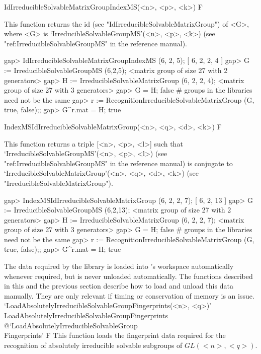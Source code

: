 \>IdIrreducibleSolvableMatrixGroupIndexMS(<n>, <p>, <k>) F

This function returns the id (see "IdIrreducibleSolvableMatrixGroup") of <G>, 
where <G> is `IrreducibleSolvableGroupMS'(<n>, <p>, <k>) (see "ref:IrreducibleSolvableGroupMS" in the {\GAP} reference manual).

\beginexample
gap> IdIrreducibleSolvableMatrixGroupIndexMS (6, 2, 5);
[ 6, 2, 2, 4 ]
gap> G := IrreducibleSolvableGroupMS (6,2,5);
<matrix group of size 27 with 2 generators>
gap> H := IrreducibleSolvableMatrixGroup (6, 2, 2, 4);
<matrix group of size 27 with 3 generators>
gap> G = H;
false # groups in the libraries need not be the same
gap> r := RecognitionIrreducibleSolvableMatrixGroup (G, true, false);;
gap> G^r.mat = H;
true
\endexample

\>IndexMSIdIrreducibleSolvableMatrixGroup(<n>, <q>, <d>, <k>) F

This function returns a triple [<n>, <p>, <l>] such that
`IrreducibleSolvableGroupMS'(<n>, <p>, <l>) (see "ref:IrreducibleSolvableGroupMS" in the {\GAP} reference manual) is conjugate to
`IrreducibleSolvableMatrixGroup'(<n>, <q>, <d>, <k>) (see "IrreducibleSolvableMatrixGroup").

\beginexample
gap> IndexMSIdIrreducibleSolvableMatrixGroup (6, 2, 2, 7);
[ 6, 2, 13 ]
gap> G := IrreducibleSolvableGroupMS (6,2,13);
<matrix group of size 27 with 2 generators>
gap> H := IrreducibleSolvableMatrixGroup (6, 2, 2, 7);
<matrix group of size 27 with 3 generators>
gap> G = H;
false # groups in the libraries need not be the same
gap> r := RecognitionIrreducibleSolvableMatrixGroup (G, true, false);;
gap> G^r.mat = H;
true
\endexample



The data required by the {\IRREDSOL} library is loaded into {\GAP}'s workspace automatically whenever required, but is never unloaded automatically. The functions described in this
and the previous section describe how to load and unload this data manually. 
They are only relevant if timing or conservation of memory is an issue.
\>`LoadAbsolutelyIrreducibleSolvableGroupFingerprints(<n>, <q>)'%
{LoadAbsolutelyIrreducibleSolvableGroupFingerprints}%
@{`LoadAbsolutelyIrreducibleSolvableGroup\\Fingerprints'} F
This function loads the fingerprint data required for the recognition
of absolutely irreducible solvable subgroups of $GL(<n>, <q>)$.

